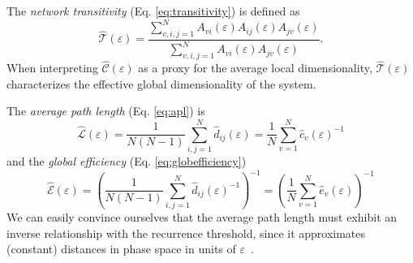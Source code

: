 		The \textit{network transitivity} (Eq. \eqref{eq:transitivity}) is defined as
\begin{equation}
\hat{\mathcal{T}}(\varepsilon)= \frac{\sum_{v,i,j=1}^N A_{vi}(\varepsilon) A_{ij}(\varepsilon) A_{jv}(\varepsilon)}{\sum_{v,i,j=1}^N A_{vi}(\varepsilon) A_{jv}(\varepsilon)}.
\label{eq:transitivityRN}
\end{equation}
\noindent
When interpreting $\hat{\mathcal{C}}(\varepsilon)$ as a proxy for the average local dimensionality, $\hat{\mathcal{T}}(\varepsilon)$ characterizes the effective global dimensionality of the system.

		The \textit{average path length} (Eq. \eqref{eq:apl}) is 
\begin{equation}
\hat{\mathcal{L}}(\varepsilon)=\frac{1}{N(N-1)} \sum_{i,j=1}^N \hat{d}_{ij}(\varepsilon) = \frac{1}{N} \sum_{v=1}^N \hat{c}_v(\varepsilon)^{-1}
\label{eq:aplRN}
\end{equation}
\noindent
and the \textit{global efficiency} (Eq. \eqref{eq:globefficiency})
\begin{equation}
\hat{\mathcal{E}}(\varepsilon)=\left(\frac{1}{N(N-1)} \sum_{i,j=1}^N \hat{d}_{ij}(\varepsilon)^{-1} \right)^{-1} = \left( \frac{1}{N} \sum_{v=1}^N \hat{e}_v(\varepsilon) \right)^{-1}
\label{eq:globefficiencyRN}
\end{equation}
\noindent
We can easily convince ourselves that the average path length must exhibit an inverse relationship with the recurrence threshold, since it approximates (constant) distances in phase space in units of $\varepsilon$~\cite{Donner2010a}.
	

